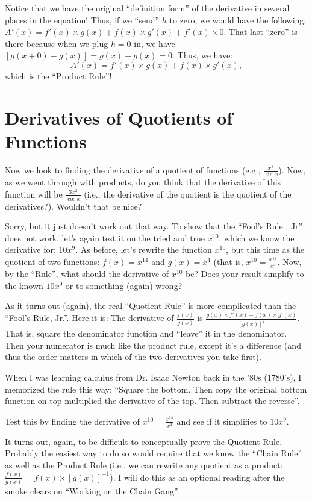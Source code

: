 \documentclass{ximera}
\begin{document}
Notice that we have the original ``definition form'' of the derivative in several places in the equation!  Thus, if we ``send'' $h$ to zero, we would have the following:   $A'(x) = f'(x) \times g(x) + f(x) \times g'(x) + f'(x) \times 0$.  That last ``zero'' is there because when we plug $h=0$ in, we have $[g(x+0)-g(x)] = g(x) - g(x) = 0$.  Thus, we have:
\[
A'(x) = f'(x) \times g(x) + f(x) \times g'(x),
\]
which is the ``Product Rule''!


\section*{Derivatives of Quotients of Functions}

Now we look to finding the derivative of a quotient of functions (e.g.,  $\frac{x^3}{\sin x}$).  Now, as we went through with products, do you think that the derivative of this function will be  $\frac{3x^2}{\cos x}$ (i.e., the derivative of the quotient is the quotient of the derivatives?).  Wouldn't that be nice?

Sorry, but it just doesn't work out that way.  To show that the ``Fool's Rule , Jr'' does not work, let's again test it on the tried and true  $x^{10}$, which we know the derivative for:   $10x^9$.  As before, let's rewrite the function  $x^{10}$, but this time as the quotient of two functions:  $f(x) = x^{14}$ and $g(x) = x^4$ (that is,  $x^{10} = \frac{x^{14}}{x^4}$.  Now, by the ``Rule'', what should the derivative of $x^{10}$  be?  Does your result simplify to the known $10x^9$ or to something (again) wrong?

 As it turns out (again), the real ``Quotient Rule'' is more complicated than the ``Fool's Rule, Jr.''.  Here it is:  The derivative of $\frac{f(x)}{g(x)}$ is  $\frac{g(x) \times f'(x) - f(x) \times g'(x)}{[g(x)]^2}$.  That is, square the denominator function and ``leave'' it in the denominator.  Then your numerator is much like the product rule, except it's a difference (and thus the order matters in which of the two derivatives you take first).
 
When I was learning calculus from Dr. Isaac Newton back in the '80s (1780's), I memorized the rule this way:  ``Square the bottom.  Then copy the original bottom function on top multiplied the derivative of the top.  Then subtract the reverse''.

Test this by finding the derivative of $x^{10} = \frac{x^{14}}{x^4}$  and see if it simplifies to $10x^9$.

It turns out, again, to be difficult to conceptually prove the Quotient Rule.  Probably the easiest way to do so would require that we know the ``Chain Rule'' as well as the Product Rule (i.e., we can rewrite any quotient as a product:   $\frac{f(x)}{g(x)} = f(x) \times [g(x)]^{-1}$).  I will do this as an optional reading after the smoke clears on ``Working on the Chain Gang''.
\end{document}
